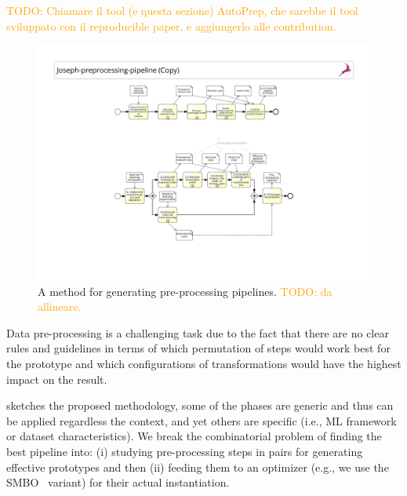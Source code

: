 \textcolor{orange}{TODO: Chiamare il tool (e questa sezione) AutoPrep, che sarebbe il tool sviluppato con il reproducible paper, e aggiungerlo alle contribution.}

\begin{figure}[t]
    \centering
    \includegraphics[clip, trim=6.5cm 3.5cm 6.5cm 8cm,width=1.0\textwidth]{chapters/data-centric/supervised/img/bpmn.pdf}
    \caption{A method for generating pre-processing pipelines. \textcolor{orange}{TODO: da allineare.}}
    \label{fig:methodology}
\end{figure}

Data pre-processing is a challenging task due to the fact that there are no clear rules and guidelines in terms of which permutation of steps would work best for the prototype and which configurations of transformations would have the highest impact on the result.

 sketches the proposed methodology, some of the phases are generic and thus can be applied regardless the context, and yet others are specific (i.e., ML framework or dataset characteristics).
We break the combinatorial problem of finding the best pipeline into: (i) studying pre-processing steps in pairs for generating effective prototypes and then (ii) feeding them to an optimizer (e.g., we use the SMBO~\cite{HyperOptICML13} variant) for their actual instantiation.

